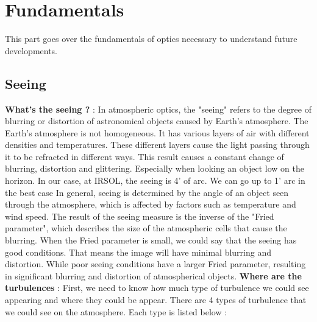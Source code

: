 \section{Fundamentals}
This part goes over the fundamentals of optics necessary to understand future developments.
\subsection{Seeing}
\textbf{What's the seeing ?} : \newline In atmospheric optics, the "seeing" refers to the degree of blurring or distortion of astronomical objects
caused by Earth's atmosphere. The Earth's atmosphere is not homogeneous. It has various layers of air with different densities and temperatures.
These different layers cause the light passing through it to be refracted in different ways. This result causes a constant change of blurring,
distortion and glittering. Especially when looking an object low on the horizon. In our case, at IRSOL, the seeing is 4' of arc. We can go up
to 1' arc in the best case\newline
In general, seeing is determined by the angle of an object seen through the atmosphere, which is affected by factors such as temperature and wind speed.
The result of the seeing measure is the inverse of the "Fried parameter", which describes the size of the atmospheric cells that cause the blurring.
When the Fried parameter is small, we could say that the seeing has good conditions. That means the image will have minimal blurring and distortion.
While poor seeing conditions have a larger Fried parameter, resulting in significant blurring and distortion of atmospherical objects.
\bigbreak
\textbf{Where are the turbulences} : \newline
First, we need to know how much type of turbulence we could see appearing and where they could be appear.\newline
There are 4 types of turbulence that we could see on the atmosphere. Each type is listed below :

